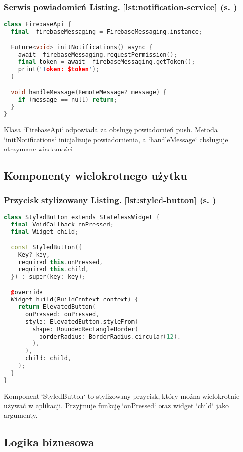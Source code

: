 \subsubsection{Serwis powiadomień \textbf{Listing. \ref{lst:notification-service} (s. \pageref{lst:notification-service})}}
\begin{lstlisting}[language=C++, caption=Serwis powiadomień, label={lst:notification-service}]
class FirebaseApi {
  final _firebaseMessaging = FirebaseMessaging.instance;

  Future<void> initNotifications() async {
    await _firebaseMessaging.requestPermission();
    final token = await _firebaseMessaging.getToken();
    print('Token: $token');
  }

  void handleMessage(RemoteMessage? message) {
    if (message == null) return;
  }
}
\end{lstlisting}
Klasa `FirebaseApi` odpowiada za obsługę powiadomień push. Metoda `initNotifications` inicjalizuje powiadomienia, a `handleMessage` obsługuje otrzymane wiadomości.

\subsection{Komponenty wielokrotnego użytku}

\subsubsection{Przycisk stylizowany \textbf{Listing. \ref{lst:styled-button} (s. \pageref{lst:styled-button})}}
\begin{lstlisting}[language=C++, caption=Komponent przycisku, label={lst:styled-button}]
class StyledButton extends StatelessWidget {
  final VoidCallback onPressed;
  final Widget child;

  const StyledButton({
    Key? key,
    required this.onPressed,
    required this.child,
  }) : super(key: key);

  @override
  Widget build(BuildContext context) {
    return ElevatedButton(
      onPressed: onPressed,
      style: ElevatedButton.styleFrom(
        shape: RoundedRectangleBorder(
          borderRadius: BorderRadius.circular(12),
        ),
      ),
      child: child,
    );
  }
}
\end{lstlisting}
Komponent `StyledButton` to stylizowany przycisk, który można wielokrotnie używać w aplikacji. Przyjmuje funkcję `onPressed` oraz widget `child` jako argumenty.

\subsection{Logika biznesowa}

